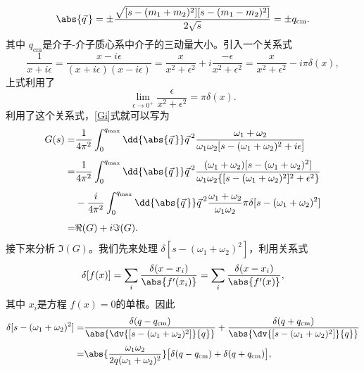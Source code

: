 \begin{equation}
	\abs{\vec{q}\,}=\pm\frac{\sqrt{[s-(m_{1}+m_{2})^2][s-(m_{1}-m_{2})^2]}}{2\sqrt{s}}=\pm q_{\text{cm}}.
\end{equation}
其中 $q_{\text{cm}}$是介子-介子质心系中介子的三动量大小。引入一个关系式
\begin{equation}
	\frac{1}{x+i\epsilon}=\frac{x-i\epsilon}{(x+i\epsilon)(x-i\epsilon)}=\frac{x}{x^2+\epsilon^2}+i\frac{-\epsilon}{x^2+\epsilon^2}=\frac{x}{x^2+\epsilon^2}-i\pi\delta(x),
\end{equation}
上式利用了
\begin{equation}
	\lim_{\epsilon \to 0^{+}}\frac{\epsilon}{x^2+\epsilon^2}=\pi\delta(x).
\end{equation}
利用了这个关系式，\eqref{Gi}式就可以写为
\begin{equation}
	\label{Gri}
	\begin{aligned}[b]
		G(s)=&\frac{1}{4\pi^2}\int^{q_{\text{max}}}_{0}\dd{\abs{\vec{q\,}}}\vec{q\,}^2\frac{\omega_{1}+\omega_{2}}{\omega_{1}\omega_{2}[s-(\omega_{1}+\omega_{2})^2+i\epsilon]}\\[1ex]
		=&\frac{1}{4\pi^2}\int^{q_{\text{max}}}_{0}\dd{\abs{\vec{q\,}}}\vec{q\,}^2\frac{(\omega_{1}+\omega_{2})[s-(\omega_{1}+\omega_{2})^2]}{\omega_{1}\omega_{2}\{[s-(\omega_{1}+\omega_{2})^2]^2+\epsilon^2\}}\\[1ex]
	 &-\frac{i}{4\pi^2}\int^{q_{\text{max}}}_{0}\dd{\abs{\vec{q\,}}}\vec{q\,}^2\frac{\omega_{1}+\omega_{2}}{\omega_{1}\omega_{2}}\pi\delta[s-(\omega_{1}+\omega_{2})^2]\\[1ex]
	=&\Re(G)+i\Im(G).
	\end{aligned}
\end{equation}
接下来分析 $\Im(G)$。我们先来处理 $\delta[s-(\omega_{1}+\omega_{2})^2]$，利用关系式
\begin{equation}
	\delta[f(x)]=\sum_{i}\frac{\delta(x-x_{i})}{\abs{f'(x_{i})}}=\sum_{i}\frac{\delta(x-x_{i})}{\abs{f'(x)}},
\end{equation}
其中 $x_{i}$是方程 $f(x)=0$的单根。因此
\begin{equation}
	\begin{aligned}[b]
		\delta[s-(\omega_{1}+\omega_{2})^2]=&\frac{\delta(q-q_{\text{cm}})}{\abs{\dv{[s-(\omega_{1}+\omega_{2})^2]}{q}}}+\frac{\delta(q+q_{\text{cm}})}{\abs{\dv{[s-(\omega_{1}+\omega_{2})^2]}{q}}}\\[1ex]
	=&\abs{\frac{\omega_{1}\omega_{2}}{2q(\omega_{1}+\omega_{2})^2}}\big[\delta(q-q_{\text{cm}})+\delta(q+q_{\text{cm}})\big],
	\end{aligned}
\end{equation}
